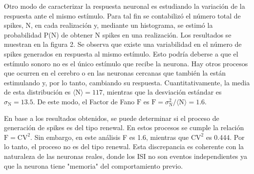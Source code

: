\documentclass[aps,prb,twocolumn,superscriptaddress,floatfix,longbibliography]{revtex4-2}
\begin{document}
Otro modo de caracterizar la respuesta neuronal es estudiando la variación de la respuesta ante el mismo estímulo. Para tal fin se contabilizó el número total de spikes, N, en cada realización y, mediante un histograma, se estimó la probabilidad P(N) de obtener N spikes en una realización. Los resultados se muestran en la figura 2. Se observa que existe una variabilidad en el número de spikes generados en respuesta al mismo estímulo. Esto podría deberse a que el estímulo sonoro no es el único estímulo que recibe la neurona. Hay otros procesos que ocurren en el cerebro o en las neuronas cercanas que también la están estimulando y, por lo tanto, cambiando su respuesta. Cuantitativamente, la media de esta distribución es $\langle \mathrm{N} \rangle = 117$, mientras que la desviación estándar es $\sigma_{\mathrm{N}} = 13.5$. De este modo, el Factor de Fano $\mathrm{F}$ es $\mathrm{F} =  \sigma_\mathrm{N}^2/\langle \mathrm{N} \rangle = 1.6$.

En base a los resultados obtenidos, se puede determinar si el proceso de generación de spikes es del tipo renewal. En estos procesos se cumple la relación $\mathrm{F} = \mathrm{CV}^2$. Sin embargo, en este análisis F es 1.6, mientras que $\mathrm{CV}^2$ es 0.444. Por lo tanto, el proceso no es del tipo renewal. Esta discrepancia es coherente con la naturaleza de las neuronas reales, donde los ISI no son eventos independientes ya que la neurona tiene "memoria" del comportamiento previo.
\end{document}
